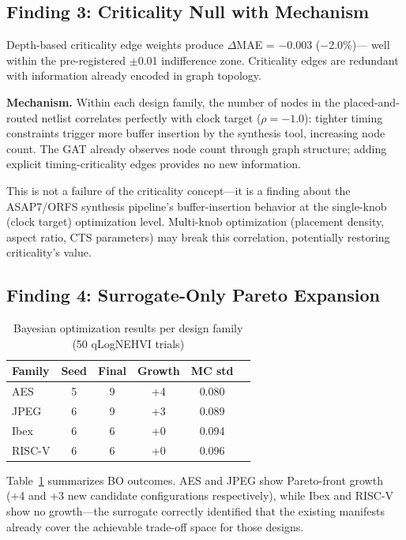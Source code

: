 \documentclass[conference]{IEEEtran}
\begin{document}
\subsection{Finding 3: Criticality Null with Mechanism}

Depth-based criticality edge weights produce $\Delta$MAE = $-$0.003 ($-$2.0\%)—
well within the pre-registered $\pm$0.01 indifference zone. Criticality edges
are redundant with information already encoded in graph topology.

\textbf{Mechanism.} Within each design family, the number of nodes in the
placed-and-routed netlist correlates perfectly with clock target
($\rho = -1.0$): tighter timing constraints trigger more buffer insertion by
the synthesis tool, increasing node count. The GAT already observes node count
through graph structure; adding explicit timing-criticality edges provides no
new information.

This is not a failure of the criticality concept—it is a finding about the
ASAP7/ORFS synthesis pipeline's buffer-insertion behavior at the single-knob
(clock target) optimization level. Multi-knob optimization (placement density,
aspect ratio, CTS parameters) may break this correlation, potentially
restoring criticality's value.

\subsection{Finding 4: Surrogate-Only Pareto Expansion}

\begin{table}[t]
\centering
\caption{Bayesian optimization results per design family (50 qLogNEHVI trials)}
\label{tab:bo}
\begin{tabular}{lccccc}
\toprule
\textbf{Family} & \textbf{Seed} & \textbf{Final} & \textbf{Growth} & \textbf{MC std} \\
\midrule
AES      & 5 & 9  & +4 & 0.080 \\
JPEG     & 6 & 9  & +3 & 0.089 \\
Ibex     & 6 & 6  & +0 & 0.094 \\
RISC-V   & 6 & 6  & +0 & 0.096 \\
\bottomrule
\end{tabular}
\end{table}

Table~\ref{tab:bo} summarizes BO outcomes. AES and JPEG show Pareto-front growth
(+4 and +3 new candidate configurations respectively), while Ibex and RISC-V
show no growth—the surrogate correctly identified that the existing manifests
already cover the achievable trade-off space for those designs.
\end{document}
